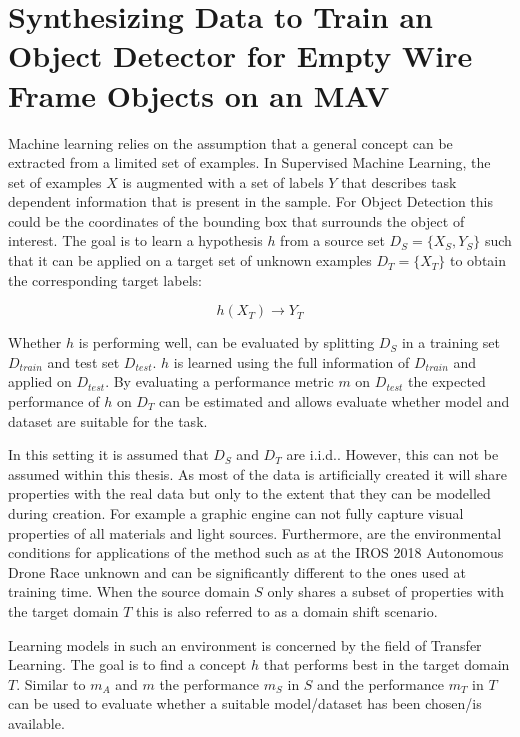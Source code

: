 \chapter{Synthesizing Data to Train an Object Detector for Empty Wire Frame Objects on an \ac{MAV}}
\label{sec:training}

Machine learning relies on the assumption that a general concept can be extracted from a limited set of examples. In Supervised Machine Learning, the set of examples $X$ is augmented with a set of labels $Y$ that describes task dependent information that is present in the sample. For Object Detection this could be the coordinates of the bounding box that surrounds the object of interest. The goal is to learn a hypothesis $h$ from a source set $D_S = \{X_{S},Y_{S}\}$ such that it can be applied on a target set of unknown examples $D_T = \{X_{T}\}$ to obtain the corresponding target labels:

$$
h(X_T)\rightarrow Y_T
$$ 

Whether $h$ is performing well, can be evaluated by splitting $D_S$ in a training set $D_{train}$ and test set $D_{test}$. $h$ is learned using the full information of $D_{train}$ and applied on $D_{test}$. By evaluating a performance metric $m$ on $D_{test}$ the expected performance of $h$ on $D_T$ can be estimated and allows evaluate whether model and dataset are suitable for the task.
			
In this setting it is assumed that $D_S$ and $D_T$ are \ac{i.i.d.}. However, this can not be assumed within this thesis. As most of the data is artificially created it will share properties with the real data but only to the extent that they can be modelled during creation. For example a graphic engine can not fully capture visual properties of all materials and light sources. Furthermore, are the environmental conditions for applications of the method such as at the \ac{IROS} 2018 Autonomous Drone Race unknown and can be significantly different to the ones used at training time. When the source domain $S$ only shares a subset of properties with the target domain $T$ this is also referred to as a domain shift scenario.

Learning models in such an environment is concerned by the field of Transfer Learning. The goal is to find a concept $h$ that performs best in the target domain $T$. Similar to $m_A$ and $m$ the performance $m_S$ in $S$ and the performance $m_T$ in $T$ can be used to evaluate whether a suitable model/dataset has been chosen/is available.

